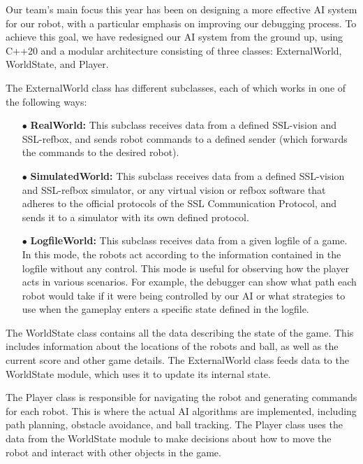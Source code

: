 \documentclass[runningheads]{llncs}
\begin{document}

Our team's main focus this year has been on designing a more effective AI system for our robot, with a particular emphasis on improving our debugging process. To achieve this goal, we have redesigned our AI system from the ground up, using C++20 and a modular architecture consisting of three classes: ExternalWorld, WorldState, and Player.

The ExternalWorld class has different subclasses, each of which works in one of the following ways:

\begin{itemize}
\item[$\bullet$] \textbf{RealWorld:} This subclass receives data from a defined SSL-vision and SSL-refbox, and sends robot commands to a defined sender (which forwards the commands to the desired robot).
\item[$\bullet$] \textbf{SimulatedWorld:} This subclass receives data from a defined SSL-vision and SSL-refbox simulator, or any virtual vision or refbox software that adheres to the official protocols of the SSL Communication Protocol, and sends it to a simulator with its own defined protocol.
\item[$\bullet$] \textbf{LogfileWorld:} This subclass receives data from a given logfile of a game. In this mode, the robots act according to the information contained in the logfile without any control. This mode is useful for observing how the player acts in various scenarios. For example, the debugger can show what path each robot would take if it were being controlled by our AI or what strategies to use when the gameplay enters a specific state defined in the logfile.
\end{itemize}

The WorldState class contains all the data describing the state of the game. This includes information about the locations of the robots and ball, as well as the current score and other game details. The ExternalWorld class feeds data to the WorldState module, which uses it to update its internal state.

The Player class is responsible for navigating the robot and generating commands for each robot. This is where the actual AI algorithms are implemented, including path planning, obstacle avoidance, and ball tracking. The Player class uses the data from the WorldState module to make decisions about how to move the robot and interact with other objects in the game.
\end{document}
